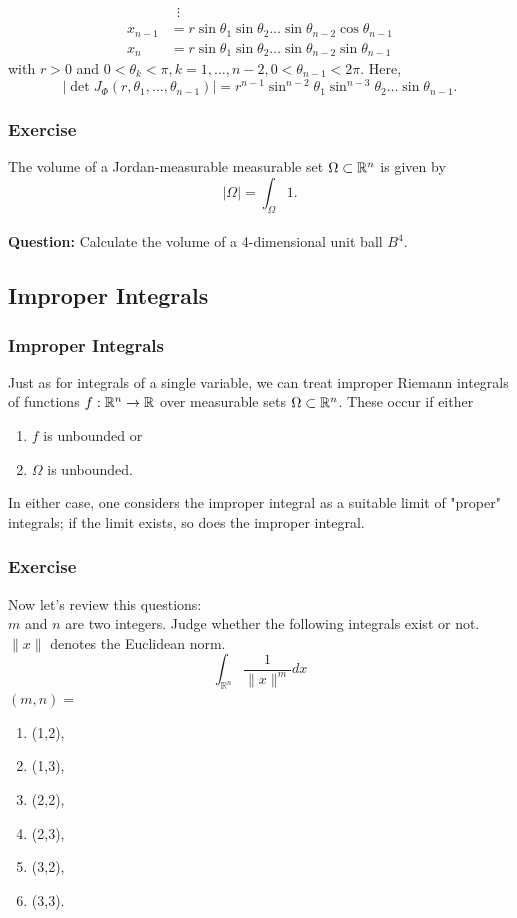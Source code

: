 \documentclass[12pt, t]{beamer}
\newcommand{\nullspace}{~\\[15pt]}
\newcommand{\Question}{\textbf{Question: }}
\begin{document}
\begin{frame}[allowframebreaks]
\begin{itemize}
\begin{align*}
                          & \,\,\,\vdots                                                     \\
                  x_{n-1} & =r\sin\theta_1\sin\theta_2\ldots\sin\theta_{n-2}
                  \cos\theta_{n-1}                                                           \\
                  x_n     & =r\sin\theta_1\sin\theta_2\ldots\sin\theta_{n-2}\sin\theta_{n-1}
              \end{align*}
              with $r>0$ and $0<\theta_k<\pi,k=1,\ldots,n-2,0<\theta_{n-1}<2\pi$. Here,
              \[|\det J_\Phi(r,\theta_1,\ldots,\theta_{n-1})|=r^{n-1}\sin^{n-2}\theta_1
                  \sin^{n-3}\theta_2\ldots\sin\theta_{n-1}.\]
    \end{itemize}
\end{frame}

\begin{frame}
    \frametitle{Exercise}
    The volume of a Jordan-measurable measurable set $\Omega\subset\mathbb{R}^n$ is given by
    \[|\Omega|=\int_\Omega1.\]
    \nullspace
    \Question Calculate the volume of a 4-dimensional unit ball $B^4$.

\end{frame}

\subsection{Improper Integrals}
\begin{frame}
    \frametitle{Improper Integrals}
    Just as for integrals of a single variable, we can treat improper Riemann
    integrals of functions $f:\mathbb{R}^n\to\mathbb{R}$ over measurable sets $\Omega\subset\mathbb{R}^n$. These occur if either
    \begin{enumerate}[1.]
        \item $f$ is unbounded or
        \item $\Omega$ is unbounded.
    \end{enumerate}
    In either case, one considers the improper integral as a suitable limit of
    "proper" integrals; if the limit exists, so does the improper integral.\\[5pt]
\end{frame}

\begin{frame}
    \frametitle{Exercise}
    Now let's review this questions:\\
    $m$ and $n$ are two integers. Judge whether the following integrals exist or not. $\|x\|$ denotes the Euclidean norm.
    \[
        \int_{\mathbb{R}^{n}} \frac{1}{\|x\|^{m}} d x
    \]
    $(m, n)=$
    \begin{enumerate}
        \item (1,2),
        \item (1,3),
        \item (2,2),
        \item (2,3),
        \item (3,2),
        \item (3,3).
    \end{enumerate}
\end{frame}
\end{document}
